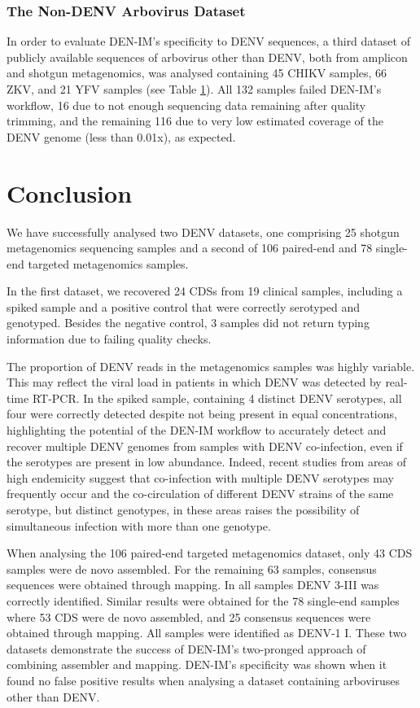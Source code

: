 \subsubsection{The Non-DENV Arbovirus Dataset}

In order to evaluate DEN-IM’s specificity to DENV sequences, a third dataset of publicly available sequences of arbovirus other than DENV, both from amplicon and shotgun metagenomics, was analysed containing 45 CHIKV samples, 66 ZKV, and 21 YFV samples (see Table \ref{}). All 132 samples failed DEN-IM’s workflow, 16 due to not enough sequencing data remaining after quality trimming, and the remaining 116 due to very low estimated coverage of the DENV genome (less than 0.01x), as expected. 

\section{Conclusion}

We have successfully analysed two DENV datasets, one comprising 25 shotgun metagenomics sequencing samples and a second of 106 paired-end and 78 single-end targeted metagenomics samples. 

In the first dataset, we recovered 24 CDSs from 19 clinical samples, including a spiked sample and a positive control that were correctly serotyped and genotyped. Besides the negative control, 3 samples did not return typing information due to failing quality checks.

The proportion of DENV reads in the metagenomics samples was highly variable. This may reflect the viral load in patients in which DENV was detected by real-time RT-PCR. In the spiked sample, containing 4 distinct DENV serotypes, all four were correctly detected despite not being present in equal concentrations, highlighting the potential of the DEN-IM workflow to accurately detect and recover multiple DENV genomes from samples with DENV co-infection, even if the serotypes are present in low abundance. Indeed, recent studies from areas of high endemicity suggest that co-infection with multiple DENV serotypes may frequently occur \citep{marinho_meningitis_nodate, reddy_occurrence_2017} and the co-circulation of different DENV strains of the same serotype, but distinct genotypes, in these areas \citep{marinho_meningitis_nodate} raises the possibility of simultaneous infection with more than one genotype.

When analysing the 106 paired-end targeted metagenomics dataset, only 43 CDS samples were de novo assembled. For the remaining 63 samples, consensus sequences were obtained through mapping. In all samples DENV 3-III was correctly identified. Similar results were obtained for the 78 single-end samples where 53 CDS were de novo assembled, and 25 consensus sequences were obtained through mapping. All samples were identified as DENV-1 I. These two datasets demonstrate the success of DEN-IM’s two-pronged approach of combining assembler and mapping. DEN-IM’s specificity was shown when it found no false positive results when analysing a dataset containing arboviruses other than DENV. 

